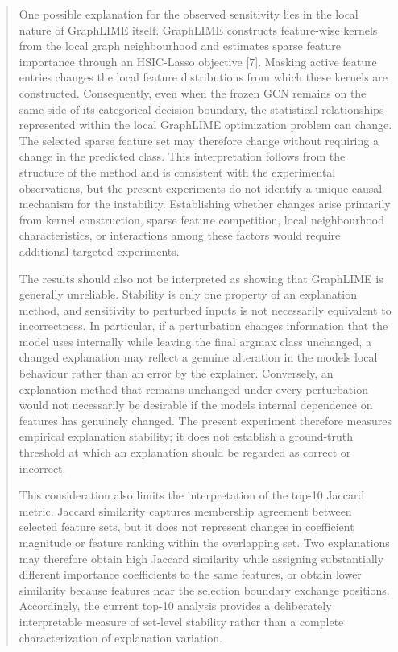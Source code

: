 \documentclass[a4paper]{article}
\begin{document}
\begin{quote}
One possible explanation for the observed sensitivity lies in the local
nature of GraphLIME itself. GraphLIME constructs feature-wise kernels
from the local graph neighbourhood and estimates sparse feature
importance through an HSIC-Lasso objective {[}7{]}. Masking active
feature entries changes the local feature distributions from which these
kernels are constructed. Consequently, even when the frozen GCN remains
on the same side of its categorical decision boundary, the statistical
relationships represented within the local GraphLIME optimization
problem can change. The selected sparse feature set may therefore change
without requiring a change in the predicted class. This interpretation
follows from the structure of the method and is consistent with the
experimental observations, but the present experiments do not identify a
unique causal mechanism for the instability. Establishing whether
changes arise primarily from kernel construction, sparse feature
competition, local neighbourhood characteristics, or interactions among
these factors would require additional targeted experiments.

The results should also not be interpreted as showing that GraphLIME is
generally unreliable. Stability is only one property of an explanation
method, and sensitivity to perturbed inputs is not necessarily
equivalent to incorrectness. In particular, if a perturbation changes
information that the model uses internally while leaving the final
argmax class unchanged, a changed explanation may reflect a genuine
alteration in the model\textquotesingle s local behaviour rather than an
error by the explainer. Conversely, an explanation method that remains
unchanged under every perturbation would not necessarily be desirable if
the model\textquotesingle s internal dependence on features has
genuinely changed. The present experiment therefore measures empirical
explanation stability; it does not establish a ground-truth threshold at
which an explanation should be regarded as correct or incorrect.

This consideration also limits the interpretation of the top-10 Jaccard
metric. Jaccard similarity captures membership agreement between
selected feature sets, but it does not represent changes in coefficient
magnitude or feature ranking within the overlapping set. Two
explanations may therefore obtain high Jaccard similarity while
assigning substantially different importance coefficients to the same
features, or obtain lower similarity because features near the selection
boundary exchange positions. Accordingly, the current top-10 analysis
provides a deliberately interpretable measure of set-level stability
rather than a complete characterization of explanation variation.


\end{quote}
\end{document}
